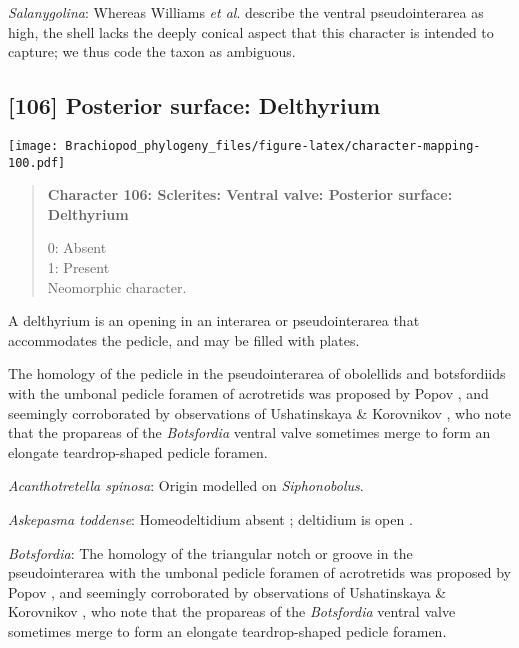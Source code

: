 \documentclass[openany]{book}
\theoremstyle{definition}
\theoremstyle{definition}
\theoremstyle{definition}
\theoremstyle{remark}
\begin{document}
\hypertarget{Salanygolina-coding-105}{}
\emph{Salanygolina}: Whereas Williams \emph{et al}.
\citeyearpar[p.~156]{Williams2000LinguliformeaCraniiformea} describe the
ventral pseudointerarea as high, the shell lacks the deeply conical
aspect that this character is intended to capture; we thus code the
taxon as ambiguous.

\subsection*{{[}106{]} Posterior surface:
Delthyrium}\label{posterior-surface-delthyrium}

\texttt{[image: Brachiopod\_phylogeny\_files/figure-latex/character-mapping-100.pdf]}

\begin{quote}
\textbf{Character 106: Sclerites: Ventral valve: Posterior surface:
Delthyrium}

0: Absent\\
1: Present\\
Neomorphic character.
\end{quote}

A delthyrium is an opening in an interarea or pseudointerarea that
accommodates the pedicle, and may be filled with plates.

The homology of the pedicle in the pseudointerarea of obolellids and
botsfordiids with the umbonal pedicle foramen of acrotretids was
proposed by Popov \citeyearpar{Popov1992TheCambrian}, and seemingly
corroborated by observations of Ushatinskaya \& Korovnikov
\citeyearpar{Ushatinskaya2016Revisionof}, who note that the propareas of
the \emph{Botsfordia} ventral valve sometimes merge to form an elongate
teardrop-shaped pedicle foramen.

\hypertarget{Acanthotretella_spinosa-coding-106}{}
\emph{Acanthotretella spinosa}: Origin modelled on \emph{Siphonobolus}.

\hypertarget{Askepasma_toddense-coding-106}{}
\emph{Askepasma toddense}: Homeodeltidium absent
\citep[p.~153]{Williams2000LinguliformeaCraniiformea}; deltidium is open
\citep[see][fig. 4]{Topper2013Theoldest}.

\hypertarget{Botsfordia-coding-106}{}
\emph{Botsfordia}: The homology of the triangular notch or groove in the
pseudointerarea with the umbonal pedicle foramen of acrotretids was
proposed by Popov \citeyearpar{Popov1992TheCambrian}, and seemingly
corroborated by observations of Ushatinskaya \& Korovnikov
\citeyearpar{Ushatinskaya2016Revisionof}, who note that the propareas of
the \emph{Botsfordia} ventral valve sometimes merge to form an elongate
teardrop-shaped pedicle foramen.
\end{document}
